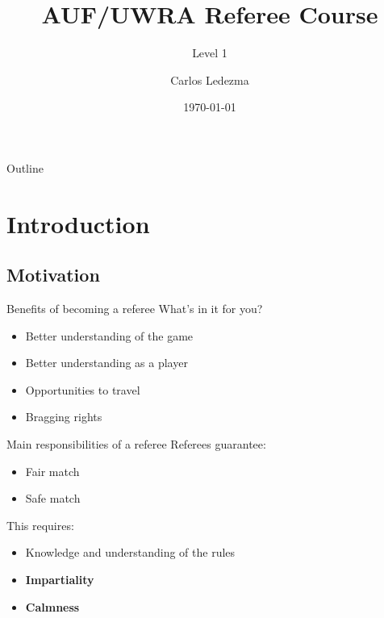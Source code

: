 \documentclass{beamer}
\title{AUF/UWRA Referee Course}
\subtitle{Level 1}
\author{Carlos Ledezma}
\date{\today}
\begin{document}
    \begin{frame}
        \titlepage
    \end{frame}

    \begin{frame}{Outline}
    \end{frame}

    \section{Introduction}
    \subsection{Motivation}

    \begin{frame}{Benefits of becoming a referee}
        What's in it for you? \pause
        \begin{itemize}
            \item Better understanding of the game \pause
            \item Better understanding as a player \pause
            \item Opportunities to travel \pause
            \item Bragging rights
        \end{itemize}
    \end{frame}

    \begin{frame}{Main responsibilities of a referee}
        \pause
        Referees guarantee:
        \begin{itemize}
            \item Fair match \pause
            \item Safe match
        \end{itemize}

        \pause

        This requires:
        \begin{itemize}
            \item Knowledge and understanding of the rules

            \pause

            \item \textbf{Impartiality}
            \item \textbf{Calmness}
        \end{itemize}
    \end{frame}
\end{document}
